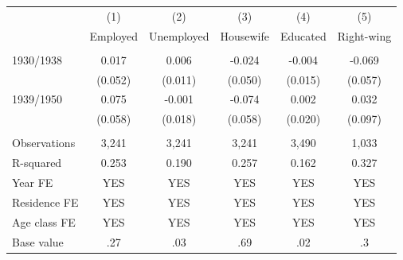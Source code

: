 \begin{tabular}{lccccc} \hline
 & (1) & (2) & (3) & (4) & (5) \\
 & Employed & Unemployed & Housewife & Educated & Right-wing \\ \hline
 &  &  &  &  &  \\
1930/1938 & 0.017 & 0.006 & -0.024 & -0.004 & -0.069 \\
 & (0.052) & (0.011) & (0.050) & (0.015) & (0.057) \\
1939/1950 & 0.075 & -0.001 & -0.074 & 0.002 & 0.032 \\
 & (0.058) & (0.018) & (0.058) & (0.020) & (0.097) \\
 &  &  &  &  &  \\
Observations & 3,241 & 3,241 & 3,241 & 3,490 & 1,033 \\
R-squared & 0.253 & 0.190 & 0.257 & 0.162 & 0.327 \\
Year FE & YES & YES & YES & YES & YES \\
Residence FE & YES & YES & YES & YES & YES \\
Age class FE & YES & YES & YES & YES & YES \\
 Base value & .27 & .03 & .69 & .02 & .3 \\ \hline
\end{tabular}
